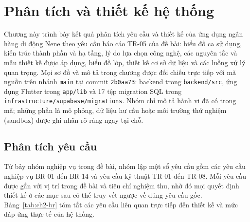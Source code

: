 \chapter{Phân tích và thiết kế hệ thống}
\label{chap:2}

Chương này trình bày kết quả phân tích yêu cầu và thiết kế của ứng dụng ngân hàng di động Nene theo yêu cầu báo cáo TR-05 của đề bài: biểu đồ ca sử dụng, kiến trúc thành phần và hạ tầng, lý do lựa chọn công nghệ, các nguyên tắc và mẫu thiết kế được áp dụng, biểu đồ lớp, thiết kế cơ sở dữ liệu và các luồng xử lý quan trọng. Mọi sơ đồ và mô tả trong chương được đối chiếu trực tiếp với mã nguồn trên nhánh \texttt{main} tại commit \texttt{2b0aa73}: backend trong \texttt{backend/\allowbreak{}src}, ứng dụng Flutter trong \texttt{app/\allowbreak{}lib} và 17 tệp migration SQL trong \texttt{infrastructure/\allowbreak{}supabase/\allowbreak{}migrations}. Nhóm chỉ mô tả hành vi đã có trong mã; những phần là mô phỏng, dữ liệu hư cấu hoặc môi trường thử nghiệm (sandbox) được ghi nhãn rõ ràng ngay tại chỗ.

\section{Phân tích yêu cầu}
\label{sec:ch2-requirements}

Từ bảy nhóm nghiệp vụ trong đề bài, nhóm lập một sổ yêu cầu gồm các yêu cầu nghiệp vụ BR-01 đến BR-14 và yêu cầu kỹ thuật TR-01 đến TR-08. Mỗi yêu cầu được gắn với vị trí trong đề bài và tiêu chí nghiệm thu, nhờ đó mọi quyết định thiết kế ở các mục sau có thể truy vết ngược về đúng yêu cầu gốc. Bảng~\ref{tab:ch2-br} tóm tắt các yêu cầu liên quan trực tiếp đến thiết kế và mức đáp ứng thực tế của hệ thống.

